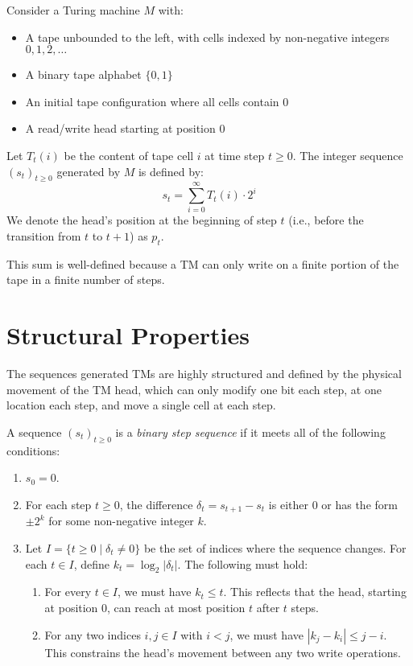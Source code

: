 \begin{definition}
\label{def:encoding}
\leanok
Consider a Turing machine $M$ with:
\begin{itemize}
\item A tape unbounded to the left, with cells indexed by non-negative integers $0, 1, 2, \ldots$
\item A binary tape alphabet $\{0, 1\}$
\item An initial tape configuration where all cells contain $0$
\item A read/write head starting at position $0$
\end{itemize}
Let $T_t(i)$ be the content of tape cell $i$ at time step $t \geq 0$. The integer sequence $(s_t)_{t \geq 0}$ generated by $M$ is defined by:
$$s_t = \sum_{i=0}^{\infty} T_t(i) \cdot 2^i$$
We denote the head's position at the beginning of step $t$ (i.e., before the transition from $t$ to $t+1$) as $p_t$.
\end{definition}

This sum is well-defined because a TM can only write on a finite portion of the tape in a finite number of steps.

\chapter{Structural Properties}

The sequences generated TMs are highly structured and defined by the physical movement of the TM head, which can only modify one bit each step, at one location each step, and move a single cell at each step.

\begin{definition}
\label{def:binary_step_sequence}
\leanok
{}
A sequence $(s_t)_{t\geq0}$ is a \emph{binary step sequence} if it meets all of the following conditions:
\begin{enumerate}
\item $s_0 = 0$.
\item For each step $t \geq 0$, the difference $\delta_t = s_{t+1} - s_t$ is either $0$ or has the form $\pm 2^k$ for some non-negative integer $k$.
\item Let $I = \{t \geq 0 \mid \delta_t \neq 0\}$ be the set of indices where the sequence changes. For each $t \in I$, define $k_t = \log_2 |\delta_t|$. The following must hold:
    \begin{enumerate}
    \item For every $t \in I$, we must have $k_t \leq t$. This reflects that the head, starting at position 0, can reach at most position $t$ after $t$ steps.
    \item For any two indices $i, j \in I$ with $i < j$, we must have $|k_j - k_i| \leq j - i$. This constrains the head's movement between any two write operations.
    \end{enumerate}
\end{enumerate}
\end{definition}

